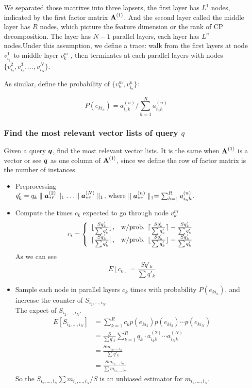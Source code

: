 \documentclass{article}
\newcommand{\Sca}[3]{{#1}^{(#2)}_{i_#2#3}}%
\newcommand{\V}[1]{{\bm{{\MakeLowercase{#1}}}}}%
\newcommand{\Vacol}[1]{\V{a}^{(#1)}_{*r}}
\newcommand{\M}[1]{{\bm{\mathbf{\MakeUppercase{#1}}}}}%
\newcommand{\norm}[2]{\parallel#1\parallel_{#2}}
\begin{document}
We separated those matrixes into three lapsers, the first layer has $L^{1}$ nodes, indicated by the first factor matrix $\M{A}^{(1)}$. And the second layer called the middle layer has $R$ nodes, which picture the feature dimension or the rank of CP decomposition. The layer has $N-1$ parallel layers, each layer has $L^{n}$ nodes.Under this assumption, we define a trace: walk from the first layers at node $v_{i_1}^1$ to middle layer $v_{k}^m$ , then terminates at each parallel layers with nodes $\{v_{i_2}^2,v_{i_3}^3,\ldots,v_{i_N}^N\}$.

As similar, define the probability of $\{v_k^m,v_{i_n}^n\}$:

\[P(e_{ki_n}) = \Sca{a}{n}{k}/\sum_{h=1}^{R}\Sca{a}{n}{h}\]
\subsubsection{Find the most relevant vector lists of query $q$}

Given a query $\V{q}$, find the most relevant vector lists. It is the same when $\M{A}^{(1)}$ is a vector or see $\V{q}$ as one column of $\M{A}^{(1)}$, since we define the row of factor matrix is the number of instances.

\begin{itemize}
  \item Preprocessing\\
   $q'_k = q_k\norm{\Vacol{2}}{1}\ldots\norm{\Vacol{N}}{1}$, where $\norm{\Vacol{n}}{1} = \sum_{h=1}^{R}\Sca{a}{n}{h}$.
  \item Compute the times $c_k$ expected to go through node $v_k^m$\\
    \begin{equation*}c_i=
    \left\{
      \begin{array}{ll}
        \lfloor \frac{Sq'_k}{\sum q'_k} \rfloor,
        & \hbox{w/prob. $\lceil \frac{Sq'_k}{\sum q'_k} \rceil - \frac{Sq'_k}{\sum q'_k}$} \\
        \lceil \frac{Sq'_k}{\sum q'_k} \rceil,
        & \hbox{w/prob. $\lfloor \frac{Sq'_k}{\sum q'_k} \rfloor - \frac{Sq'_k}{\sum q'_k}$}
      \end{array}
    \right.
    \end{equation*}
    As we can see \[ E[c_k] = \frac{Sq'_k}{\sum q'_k}\]
  \item Sample each node in parallel layers $c_k$ times with probability $P(e_{ki_n})$, and increase the counter of $S_{i_2,\ldots,i_N}$ \\
  The expect of $S_{i_2,\ldots,i_N}$.
        \begin{align*}
        E[S_{i_2,\ldots,i_N}] &= \sum_{k=1}^{R} c_k p(e_{ki_2}) p(e_{ki_3}) \cdots p(e_{ki_N})\\
               &= \frac{S}{{\sum q'_k}}\sum_{k=1}^{R}q_k\cdot\Sca{a}{2}{k}\cdots\Sca{a}{N}{k}\\
               &= \frac{Sm_{i_2,\ldots,i_N}}{{\sum q'_k}}\\
               &= \frac{Sm_{i_2,\ldots,i_N}}{{\sum m_{i_2,\ldots,i_N}}}
        \end{align*}
    So the  $S_{i_2,\ldots,i_N}{\sum m_{i_2,\ldots,i_N}}/S$ is an unbiased estimator for $m_{i_2,\ldots,i_N}$.
\end{itemize}
\end{document}
